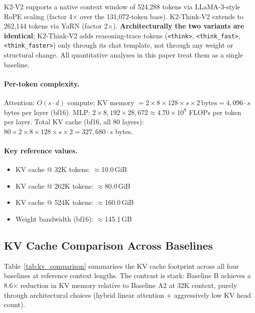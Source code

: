 \documentclass[11pt]{article}
\begin{document}
K2-V2 supports a native context window of 524,288 tokens via LLaMA-3-style RoPE scaling (factor 4$\times$ over the 131,072-token base). K2-Think-V2 extends to 262,144 tokens via YaRN (factor 2$\times$). \textbf{Architecturally the two variants are identical}; K2-Think-V2 adds reasoning-trace tokens (\texttt{<think>}, \texttt{<think\_fast>}, \texttt{<think\_faster>}) only through its chat template, not through any weight or structural change. All quantitative analyses in this paper treat them as a single baseline.

\paragraph{Per-token complexity.}
Attention: $O(s \cdot d)$ compute; KV memory $= 2 \times 8 \times 128 \times s \times 2\,\text{bytes} = 4{,}096 \cdot s$ bytes per layer (bf16).
MLP: $2 \times 8{,}192 \times 28{,}672 \approx 4.70 \times 10^8$ FLOPs per token per layer.
Total KV cache (bf16, all 80 layers): $80 \times 2 \times 8 \times 128 \times s \times 2 = 327{,}680 \cdot s$ bytes.

\paragraph{Key reference values.}
\begin{itemize}
  \item KV cache @ 32K tokens: $\approx$10.0\,GiB
  \item KV cache @ 262K tokens: $\approx$80.0\,GiB
  \item KV cache @ 524K tokens: $\approx$160.0\,GiB
  \item Weight bandwidth (bf16): $\approx$145.1\,GB
\end{itemize}

\subsection{KV Cache Comparison Across Baselines}
\label{sec:kv_comparison}

Table~\ref{tab:kv_comparison} summarises the KV cache footprint across all four baselines at reference context lengths.
The contrast is stark: Baseline B achieves a 8.6$\times$ reduction in KV memory relative to Baseline A2 at 32K context, purely through architectural choices (hybrid linear attention + aggressively low KV head count).
\end{document}
